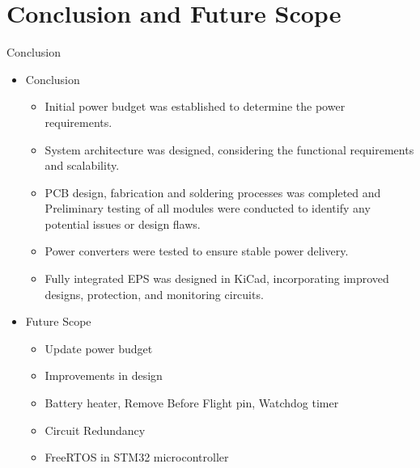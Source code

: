 \documentclass[aspectratio=169]{beamer}
\begin{document}
			\section{Conclusion and Future Scope}
			\begin{frame}{Conclusion}
				\begin{itemize}
					\item Conclusion
					\begin{itemize}
						\item Initial power budget was established to determine the power requirements.   
						\item System architecture was designed, considering the functional requirements and scalability.
						\item PCB design, fabrication and soldering processes was completed and Preliminary testing of all modules were conducted to identify any potential issues or design flaws.
						\item  Power converters were tested to ensure stable power delivery.
						\item Fully integrated EPS was designed in KiCad, incorporating improved designs, protection, and monitoring circuits.
					\end{itemize}
				\end{itemize}
				\begin{itemize}
					\item Future Scope
					\begin{itemize}
						\item Update power budget
						\item Improvements in design
						\item Battery heater, Remove Before Flight pin, Watchdog timer
						\item Circuit Redundancy
						\item FreeRTOS in STM32 microcontroller
					\end{itemize}
				\end{itemize}
			\end{frame}
			
\end{document}
